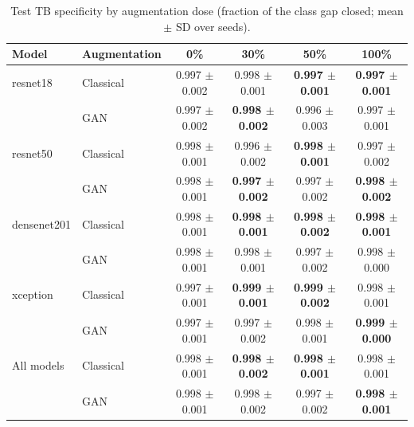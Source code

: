 \begin{table}[htbp]
\centering
\caption{Test TB specificity by augmentation dose (fraction of the class gap closed; mean $\pm$ SD over seeds).}
\label{tab:dose_tb_specificity}
\begin{tabular}{llcccc}
\toprule
Model & Augmentation & 0\% & 30\% & 50\% & 100\% \\
\midrule
resnet18 & Classical & 0.997 $\pm$ 0.002 & 0.998 $\pm$ 0.001 & \textbf{0.997 $\pm$ 0.001} & \textbf{0.997 $\pm$ 0.001} \\
 & GAN & 0.997 $\pm$ 0.002 & \textbf{0.998 $\pm$ 0.002} & 0.996 $\pm$ 0.003 & 0.997 $\pm$ 0.001 \\
\addlinespace
resnet50 & Classical & 0.998 $\pm$ 0.001 & 0.996 $\pm$ 0.002 & \textbf{0.998 $\pm$ 0.001} & 0.997 $\pm$ 0.002 \\
 & GAN & 0.998 $\pm$ 0.001 & \textbf{0.997 $\pm$ 0.002} & 0.997 $\pm$ 0.002 & \textbf{0.998 $\pm$ 0.002} \\
\addlinespace
densenet201 & Classical & 0.998 $\pm$ 0.001 & \textbf{0.998 $\pm$ 0.001} & \textbf{0.998 $\pm$ 0.002} & \textbf{0.998 $\pm$ 0.001} \\
 & GAN & 0.998 $\pm$ 0.001 & 0.998 $\pm$ 0.001 & 0.997 $\pm$ 0.002 & 0.998 $\pm$ 0.000 \\
\addlinespace
xception & Classical & 0.997 $\pm$ 0.001 & \textbf{0.999 $\pm$ 0.001} & \textbf{0.999 $\pm$ 0.002} & 0.998 $\pm$ 0.001 \\
 & GAN & 0.997 $\pm$ 0.001 & 0.997 $\pm$ 0.002 & 0.998 $\pm$ 0.001 & \textbf{0.999 $\pm$ 0.000} \\
\addlinespace
All models & Classical & 0.998 $\pm$ 0.001 & \textbf{0.998 $\pm$ 0.002} & \textbf{0.998 $\pm$ 0.001} & 0.998 $\pm$ 0.001 \\
 & GAN & 0.998 $\pm$ 0.001 & 0.998 $\pm$ 0.002 & 0.997 $\pm$ 0.002 & \textbf{0.998 $\pm$ 0.001} \\
\bottomrule
\end{tabular}
\end{table}